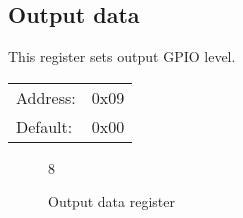 \documentclass{article}
\begin{document}
	\subsection{Output data}

		This register sets output GPIO level.

		\begin{tabular}{ l c }
			Address: & 0x09 \\
			Default: & 0x00 \\
		\end{tabular}

		\begin{figure}[H]
			\centering
			\begin{bytefield}[
				bitwidth=0.1\linewidth]{8}
				 \\
			\end{bytefield}
			\caption{Output data register}
			\label{reg:output_value}
		\end{figure}
\end{document}

